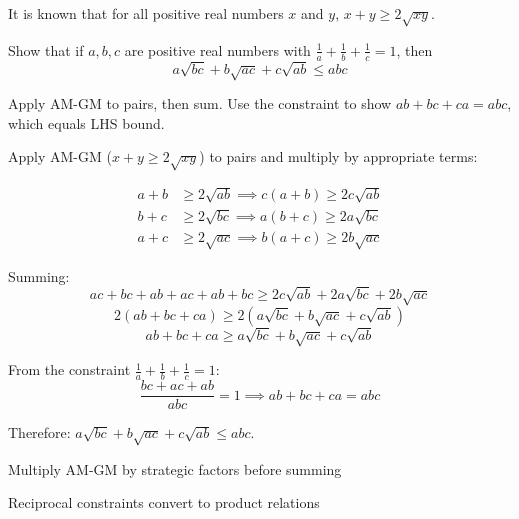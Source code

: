 \begin{problem}
It is known that for all positive real numbers $x$ and $y$, $x + y \ge 2\sqrt{xy}$.

Show that if $a, b, c$ are positive real numbers with $\frac{1}{a} + \frac{1}{b} + \frac{1}{c} = 1$, then
\[ a\sqrt{bc} + b\sqrt{ac} + c\sqrt{ab} \le abc \]
\end{problem}

\begin{hint}
Apply AM-GM to pairs, then sum. Use the constraint to show $ab + bc + ca = abc$, which equals LHS bound.
\end{hint}

\begin{solution}
Apply AM-GM ($x+y \ge 2\sqrt{xy}$) to pairs and multiply by appropriate terms:

\begin{align*}
a+b &\ge 2\sqrt{ab} \implies c(a+b) \ge 2c\sqrt{ab} \\
b+c &\ge 2\sqrt{bc} \implies a(b+c) \ge 2a\sqrt{bc} \\
a+c &\ge 2\sqrt{ac} \implies b(a+c) \ge 2b\sqrt{ac}
\end{align*}

Summing:
\[ ac + bc + ab + ac + ab + bc \ge 2c\sqrt{ab} + 2a\sqrt{bc} + 2b\sqrt{ac} \]
\[ 2(ab + bc + ca) \ge 2(a\sqrt{bc} + b\sqrt{ac} + c\sqrt{ab}) \]
\[ ab + bc + ca \ge a\sqrt{bc} + b\sqrt{ac} + c\sqrt{ab} \]

From the constraint $\frac{1}{a} + \frac{1}{b} + \frac{1}{c} = 1$:
\[ \frac{bc + ac + ab}{abc} = 1 \implies ab + bc + ca = abc \]

Therefore: $a\sqrt{bc} + b\sqrt{ac} + c\sqrt{ab} \le abc$.
\end{solution}

\begin{takeaways}

\item Multiply AM-GM by strategic factors before summing
\item Reciprocal constraints convert to product relations

\end{takeaways}
